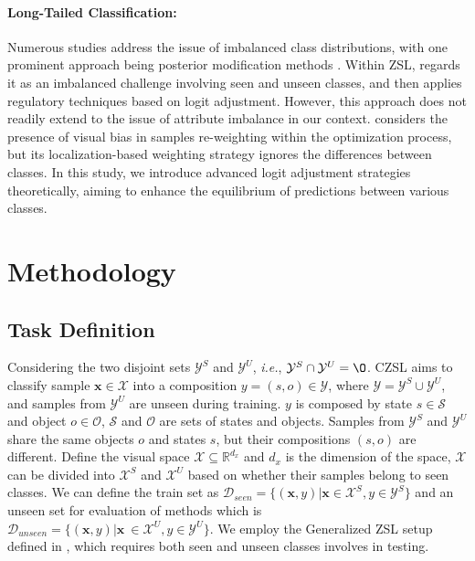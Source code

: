 \documentclass[letterpaper]{article} %
\newcommand{\mx}{\mathbf{x}}
\newcommand{\ie}{\textit{i.e.}}
\theoremstyle{definition}
\begin{document}
\paragraph{Long-Tailed Classification:} Numerous studies address the issue of imbalanced class distributions, with one prominent approach being posterior modification methods \cite{long1, long3, hou2021detecting, menon2020long, focal}. Within ZSL, \citet{chen2022zero} regards it as an imbalanced challenge involving seen and unseen classes, and then applies regulatory techniques based on logit adjustment. However, this approach does not readily extend to the issue of attribute imbalance in our context. \citet{jiang2022mutual} considers the presence of visual bias in samples re-weighting within the optimization process, but its localization-based weighting strategy ignores the differences between classes. In this study, we introduce advanced logit adjustment strategies theoretically, aiming to enhance the equilibrium of predictions between various classes.


\section{Methodology}\label{Sec.methodology}

\subsection{Task Definition} \label{subsec.taskdefine}
Considering the two disjoint sets $\mathcal{Y}^S$ and $\mathcal{Y}^U$, \ie, $\mathcal{Y}^S \cap \mathcal{Y}^U = \O$. CZSL aims to classify sample $\mx \in \mathcal{X}$ into a composition $y=(s,o) \in \mathcal{Y}$, where $\mathcal{Y} = \mathcal{Y}^S \cup \mathcal{Y}^U$, and samples from $\mathcal{Y}^U$ are unseen during training. $y$ is composed by state $s\in \mathcal{S}$ and object $o \in \mathcal{O}$, $\mathcal{S}$ and $\mathcal{O}$ are sets of states and objects. Samples from $\mathcal{Y}^S$ and $\mathcal{Y}^{U}$ share the same objects $o$ and states $s$, but their compositions $(s,o)$ are different. Define the visual space $\mathcal{X}\subseteq \mathbb{R}^{d_x}$ and $d_x$ is the dimension of the space, $\mathcal{X}$ can be divided into $\mathcal{X}^S$ and $\mathcal{X}^U$ based on whether their samples belong to seen classes. We can define the train set as $\mathcal{D}_{seen}=\{(\mx,y) | \mx \in \mathcal{X}^S, y \in \mathcal{Y}^S \}$ and an unseen set for evaluation of methods which is $\mathcal{D}_{unseen}=\{(\mx,y)|\mx\ \in \mathcal{X}^U,y\in \mathcal{Y}^U\}$. We employ the Generalized ZSL setup defined in \citet{xian2017zero}, which requires both seen and unseen classes involves in testing.
\end{document}

